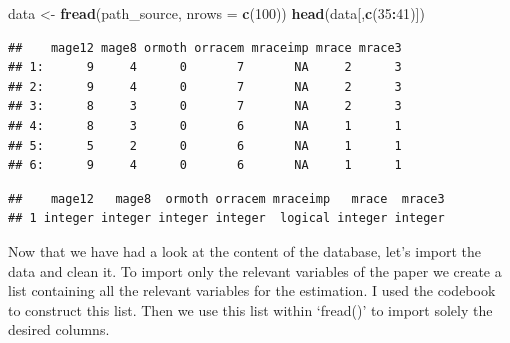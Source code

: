 \documentclass[]{book}
\newenvironment{Shaded}{\begin{snugshade}}{\end{snugshade}}
\newcommand{\KeywordTok}[1]{\textcolor[rgb]{0.13,0.29,0.53}{\textbf{#1}}}
\newcommand{\DataTypeTok}[1]{\textcolor[rgb]{0.13,0.29,0.53}{#1}}
\newcommand{\DecValTok}[1]{\textcolor[rgb]{0.00,0.00,0.81}{#1}}
\newcommand{\StringTok}[1]{\textcolor[rgb]{0.31,0.60,0.02}{#1}}
\newcommand{\OperatorTok}[1]{\textcolor[rgb]{0.81,0.36,0.00}{\textbf{#1}}}
\newcommand{\NormalTok}[1]{#1}
\begin{document}
\begin{Shaded}
\begin{Highlighting}[]
\NormalTok{data <-}\StringTok{ }\KeywordTok{fread}\NormalTok{(path_source, }\DataTypeTok{nrows =} \KeywordTok{c}\NormalTok{(}\DecValTok{100}\NormalTok{))}
\KeywordTok{head}\NormalTok{(data[,}\KeywordTok{c}\NormalTok{(}\DecValTok{35}\OperatorTok{:}\DecValTok{41}\NormalTok{)])}
\end{Highlighting}
\end{Shaded}

\begin{verbatim}
##    mage12 mage8 ormoth orracem mraceimp mrace mrace3
## 1:      9     4      0       7       NA     2      3
## 2:      9     4      0       7       NA     2      3
## 3:      8     3      0       7       NA     2      3
## 4:      8     3      0       6       NA     1      1
## 5:      5     2      0       6       NA     1      1
## 6:      9     4      0       6       NA     1      1
\end{verbatim}

\begin{Shaded}
\end{Shaded}

\begin{verbatim}
##    mage12   mage8  ormoth orracem mraceimp   mrace  mrace3
## 1 integer integer integer integer  logical integer integer
\end{verbatim}

Now that we have had a look at the content of the database, let's import
the data and clean it. To import only the relevant variables of the
paper we create a list containing all the relevant variables for the
estimation. I used the codebook to construct this list. Then we use this
list within `fread()' to import solely the desired columns.
\end{document}

